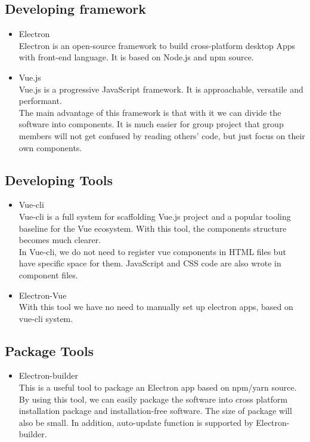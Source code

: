 \subsection{Developing framework}
\begin{itemize}
    \item Electron\\
    Electron is an open-source framework to build cross-platform desktop Apps with front-end language. It is based on Node.js and npm source.
    \item Vue.js\\
    Vue.js is a progressive JavaScript framework. It is approachable, versatile and performant.\\
    The main advantage of this framework is that with it we can divide the software into components. It is much easier for group project that group members will not get confused by reading others’ code, but just focus on their own components.
\end{itemize}

\subsection{Developing Tools}
\begin{itemize}
    \item Vue-cli\\
    Vue-cli is a full system for scaffolding Vue.js project and a popular tooling baseline for the Vue ecosystem.
    With this tool, the components structure becomes much clearer.\\
    In Vue-cli, we do not need to register vue components in HTML files but have specific space for them. JavaScript and CSS code are also wrote in component files. 
    \item Electron-Vue\\
    With this tool we have no need to manually set up electron apps, based on vue-cli system.
\end{itemize}

\subsection{Package Tools}
\begin{itemize}
    \item Electron-builder\\
    This is a useful tool to package an Electron app based on npm/yarn source.\\
    By using this tool, we can easily package the software into cross platform installation package and installation-free software. The size of package will also be small. In addition, auto-update function is supported by Electron-builder.
\end{itemize}

